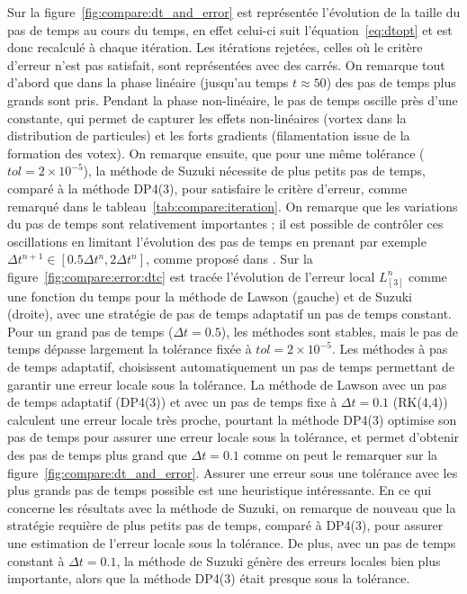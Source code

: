 Sur la figure~\ref{fig:compare:dt_and_error} est représentée l'évolution de la taille du pas de temps au cours du temps, en effet celui-ci suit l'équation~\eqref{eq:dtopt} et est donc recalculé à chaque itération. Les itérations rejetées, celles où le critère d'erreur n'est pas satisfait, sont représentées avec des carrés. On remarque tout d'abord que dans la phase linéaire (jusqu'au temps $t\approx 50$) des pas de temps plus grands sont pris. Pendant la phase non-linéaire, le pas de temps oscille près d'une constante, qui permet de capturer les effets non-linéaires (vortex dans la distribution de particules) et les forts gradients (filamentation issue de la formation des votex). On remarque ensuite, que pour une même tolérance ($tol=2\times10^{-5}$), la méthode de Suzuki nécessite de plus petits pas de temps, comparé à la méthode DP4(3), pour satisfaire le critère d'erreur, comme remarqué dans le tableau~\ref{tab:compare:iteration}. On remarque que les variations du pas de temps sont relativement importantes ; il est possible de contrôler ces oscillations en limitant l'évolution des pas de temps en prenant par exemple $\Delta t^{n+1}\in[0.5\Delta t^n,2\Delta t^n]$, comme proposé dans \cite{Balac:2014}. Sur la figure~\ref{fig:compare:error:dtc} est tracée l'évolution de l'erreur local $L_{[3]}^n$ comme une fonction du temps pour la méthode de Lawson (gauche) et de Suzuki (droite), avec une stratégie de pas de temps adaptatif un pas de temps constant. Pour un grand pas de temps ($\Delta t = 0.5$), les méthodes sont stables, mais le pas de temps dépasse largement la tolérance fixée à $tol=2\times10^{-5}$. Les méthodes à pas de temps adaptatif, choisissent automatiquement un pas de temps permettant de garantir une erreur locale sous la tolérance. La méthode de Lawson avec un pas de temps adaptatif (DP4(3)) et avec un pas de temps fixe à $\Delta t = 0.1$ (RK(4,4)) calculent une erreur locale très proche, pourtant la méthode DP4(3) optimise son pas de temps pour assurer une erreur locale sous la tolérance, et permet d'obtenir des pas de temps plus grand que $\Delta t =0.1$ comme on peut le remarquer sur la figure~\ref{fig:compare:dt_and_error}. Assurer une erreur sous une tolérance avec les plus grands pas de temps possible est une heuristique intéressante. En ce qui concerne les résultats avec la méthode de Suzuki, on remarque de nouveau que la stratégie requière de plus petits pas de temps, comparé à DP4(3), pour assurer une estimation de l'erreur locale sous la tolérance. De plus, avec un pas de temps constant à $\Delta t = 0.1$, la méthode de Suzuki génère des erreurs locales bien plus importante, alors que la méthode DP4(3) était presque sous la tolérance.

